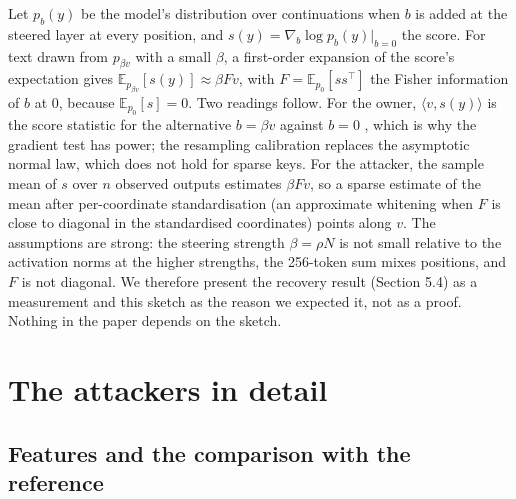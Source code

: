 \documentclass[11pt,letterpaper]{article}
\begin{document}
Let \(p_b(y)\) be the model's distribution over continuations when \(b\) is added at the steered layer at every position, and \(s(y) = \nabla_b \log p_b(y) |_{b = 0}\) the score. For text drawn from \(p_{\beta v}\) with a small \(\beta\), a first-order expansion of the score's expectation gives \(\mathbb{E}_{p_{\beta v}}[s(y)] \approx \beta F v\), with \(F = \mathbb{E}_{p_0}[s s^\top]\) the Fisher information of \(b\) at 0, because \(\mathbb{E}_{p_0}[s] = 0\). Two readings follow. For the owner, \(\langle v, s(y) \rangle\) is the score statistic for the alternative \(b = \beta v\) against \(b = 0\) \citep{rao1948score}, which is why the gradient test has power; the resampling calibration replaces the asymptotic normal law, which does not hold for sparse keys. For the attacker, the sample mean of \(s\) over \(n\) observed outputs estimates \(\beta F v\), so a sparse estimate of the mean after per-coordinate standardisation (an approximate whitening when \(F\) is close to diagonal in the standardised coordinates) points along \(v\). The assumptions are strong: the steering strength \(\beta = \rho N\) is not small relative to the activation norms at the higher strengths, the 256-token sum mixes positions, and \(F\) is not diagonal. We therefore present the recovery result (Section 5.4) as a measurement and this sketch as the reason we expected it, not as a proof. Nothing in the paper depends on the sketch.

\hypertarget{the-attackers-in-detail}{%
\section{The attackers in detail}\label{the-attackers-in-detail}}

\hypertarget{features-and-the-comparison-with-the-reference}{%
\subsection{Features and the comparison with the reference}\label{features-and-the-comparison-with-the-reference}}
\end{document}
